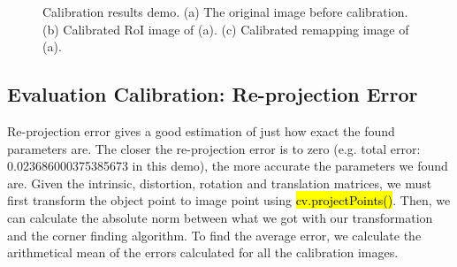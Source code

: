 \documentclass{article}
\begin{document}
\begin{figure}[!t]
	\centering
	\hfill
	\caption{Calibration results demo. (a) The original image before calibration. (b) Calibrated RoI image of (a). (c) Calibrated remapping image of (a).}
	\vspace{-1.0em}
	\label{fig_calib_results}
\end{figure}

\subsection{Evaluation Calibration: Re-projection Error}
\label{ssec: re_projection_err}
Re-projection error gives a good estimation of just how exact the found parameters are. The closer the re-projection error is to zero (e.g. total error: 0.023686000375385673 in this demo), the more accurate the parameters we found are. Given the intrinsic, distortion, rotation and translation matrices, we must first transform the object point to image point using \hl{cv.projectPoints()}. Then, we can calculate the absolute norm between what we got with our transformation and the corner finding algorithm. To find the average error, we calculate the arithmetical mean of the errors calculated for all the calibration images.
\end{document}
